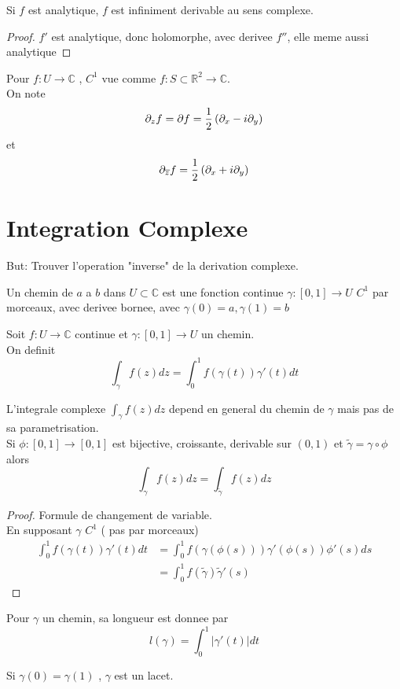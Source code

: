 \documentclass[../main.tex]{subfiles}
\begin{document}
\begin{crly}
Si $f$ est analytique, $f$ est infiniment derivable au sens complexe.
\end{crly}
\begin{proof}
$f'$ est analytique, donc holomorphe, avec derivee $f''$, elle meme aussi analytique
\end{proof}
\begin{defn}
	Pour $f: U \to \mathbb{C}$ , $C^{1}$ vue comme $f: S \subset \mathbb{R}^{2}\to \mathbb{C}$.\\
	On note
	\[ 
		\partial_z f  = \partial f = \frac{1}{2} \left( \partial_x - i \partial_y\right) 
	\]
	et
	\[ 
		\partial_{ \overline{z}} f= \frac{1}{2} \left(\partial_x + i \partial_y \right) 
	\]
	
\end{defn}
\section{Integration Complexe}
But: Trouver l'operation "inverse" de la derivation complexe.\\
\begin{defn}[Chemin]
	Un chemin de $a$ a $b$ dans $U \subset \mathbb{C}$ est une fonction continue $\gamma: [ 0,1] \to U$ $C^{1}$ par morceaux, avec derivee bornee, avec $\gamma( 0) =a, \gamma ( 1) =b$ 
\end{defn}
\begin{defn}
	Soit $f: U \to \mathbb{C}$ continue et $\gamma: [ 0,1] \to U$ un chemin.\\
	On definit
	\[ 
		\int_{\gamma} f( z) dz = \int_{ 0 }^{ 1 } f( \gamma( t) ) \gamma'( t) dt
	\]
	
\end{defn}
\begin{rmq}
	L'integrale complexe $\int_{\gamma} f( z) dz$ depend en general du chemin de $\gamma$ mais pas de sa parametrisation.\\
	Si $\phi : [ 0,1] \to [ 0,1] $ est bijective, croissante, derivable sur $ ( 0,1) $ et $\tilde { \gamma} = \gamma \circ \phi$ alors
	\[ 
		\int_{ \gamma }^{  } f( z) dz = \int_{ \tilde { \gamma}  }^{  } f( z) dz
	\]
	
\end{rmq}
\begin{proof}
Formule de changement de variable.\\
En supposant $\gamma $ $C^{1}$  ( pas par morceaux) 
\begin{align*}
	\int_{ 0 }^{ 1 } f( \gamma( t) ) \gamma'( t) dt &= \int_{ 0 }^{ 1 }f ( \gamma( \phi( s) ) ) \gamma'( \phi( s) ) \phi'( s) ds\\
							&= \int_{ 0 }^{ 1 }f( \tilde\gamma ) \tilde { \gamma } '( s) 
\end{align*}

\end{proof}
\begin{defn}[Longueur]
	Pour $\gamma$ un chemin, sa longueur est donnee par
	\[ 
		l( \gamma) = \int_{ 0 }^{ 1 }| \gamma'( t) | dt
	\]
		
\end{defn}
\begin{defn}[Lacet]
	Si $\gamma( 0) =\gamma( 1) $ , $\gamma$ est un lacet.
\end{defn}
\end{document}
